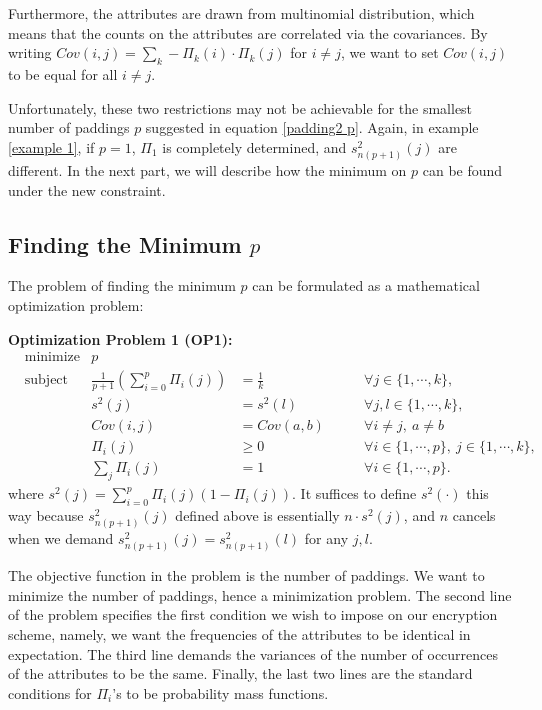Furthermore, the attributes are drawn from multinomial distribution, which means that the counts on the attributes are correlated via the covariances. By writing $Cov(i, j) = \sum_{k} - \Pi_k(i) \cdot \Pi_k(j)$ for $i \neq j$, we want to set $Cov(i,j)$ to be equal for all $i \neq j$.

Unfortunately, these two restrictions may not be achievable for the smallest number of paddings $p$ suggested in equation \ref{padding2 p}. Again, in example \ref{example 1}, if $p = 1$, $\Pi_1$ is completely determined, and $s_{n(p+1)}^2(j)$ are different. In the next part, we will describe how the minimum on $p$ can be found under the new constraint.


\subsection{Finding the Minimum $p$} 
The problem of finding the minimum $p$ can be formulated as a mathematical optimization problem:

\textbf{Optimization Problem 1 (OP1):}
\begin{equation*}
	\begin{aligned}
		& \text{minimize}    & p 		&&\\
		& \text{subject to}  & \frac{1}{p+1} \left(\sum_{i=0}^{p} \Pi_i(j)\right) & = \frac{1}{k} \qquad &\forall j \in \{1, \cdots, k\}, \\
		& 					 & s^2(j) & = s^2(l) \qquad &\forall j,l \in \{1, \cdots, k\},\\
		&					 & Cov(i, j) & = Cov(a, b) \qquad & \forall i \neq j, \ a \neq b \\
		& 					 & \Pi_i(j) & \geq 0 \qquad &\forall i \in \{1, \cdots, p\}, \  j \in \{1, \cdots, k\}, \\
		&					 & \sum_{j}\Pi_i(j) & = 1 \qquad &\forall i \in \{1, \cdots, p\}.
	\end{aligned}
\end{equation*}
where $s^2(j) = \sum_{i= 0}^{p} \Pi_i(j) (1 - \Pi_i(j))$. It suffices to define $s^2(\cdot)$ this way because $s_{n(p+1)}^2(j)$ defined above is essentially $n \cdot s^2(j)$, and $n$ cancels when we demand $s_{n(p+1)}^2(j) = s_{n(p+1)}^2(l)$ for any $j, l$.

The objective function in the problem is the number of paddings. We want to minimize the number of paddings, hence a minimization problem. The second line of the problem specifies the first condition we wish to impose on our encryption scheme, namely, we want the frequencies of the attributes to be identical in expectation. The third line demands the variances of the number of occurrences of the attributes to be the same. Finally, the last two lines are the standard conditions for $\Pi_i$'s to be probability mass functions.

